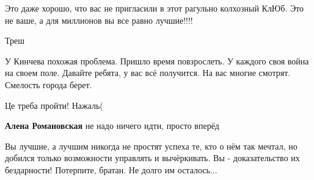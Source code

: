 \begin{itemize}
Это даже хорошо, что вас не пригласили в этот рагульно колхозный КлЮб. Это не ваше, а для миллионов вы все равно лучшие!!!!

 
Треш

 

У Кинчева похожая проблема. Пришло время повзрослеть. У каждого своя война на
своем поле. Давайте ребята, у вас всё получится. На вас многие смотрят.
Смелость города берет.


 
Це треба пройти! Нажаль(

\begin{itemize}
 
\textbf{Алена Романовская} не надо ничего идти, просто вперёд
\end{itemize}

 
Вы лучшие, а лучшим никогда не простят успеха те, кто о нём так мечтал, но добился только возможности управлять и вычёркивать. Вы - доказательство их бездарности! Потерпите, братан. Не долго им осталось...

 

\end{itemize}
